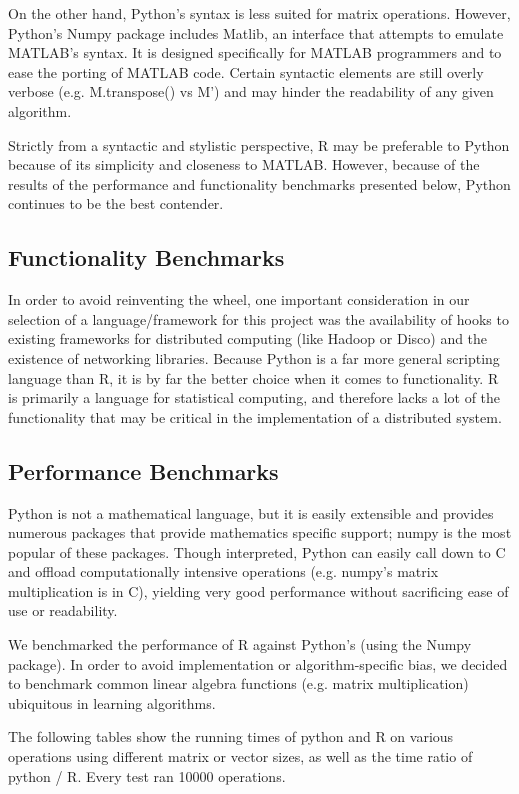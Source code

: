 \documentclass[%
  final,
  notitlepage,
  narroweqnarray,
  inline,
]{ieee}
\begin{document}
On the other hand, Python's syntax is less suited for matrix operations.
However, Python's Numpy package includes Matlib, an interface that attempts to
emulate MATLAB's syntax. It is designed specifically for MATLAB programmers and
to ease the porting of MATLAB code. Certain syntactic elements are still overly
verbose (e.g. M.transpose() vs M') and may hinder the readability of any given
algorithm.

Strictly from a syntactic and stylistic perspective, R may be preferable to
Python because of its simplicity and closeness to MATLAB. However, because
of the results of the performance and functionality benchmarks presented below,
Python continues to be the best contender.

\subsection{Functionality Benchmarks}

In order to avoid reinventing the wheel, one important consideration in our
selection of a language/framework for this project was the availability of hooks
to existing frameworks for distributed computing (like Hadoop or Disco) and the
existence of networking libraries. Because Python is a far more general
scripting language than R, it is by far the better choice when it comes to
functionality. R is primarily a language for statistical computing, and
therefore lacks a lot of the functionality that may be critical in the
implementation of a distributed system.

\subsection{Performance Benchmarks}

Python is not a mathematical language, but it is easily extensible and provides
numerous packages that provide mathematics specific support; numpy is the most
popular of these packages. Though interpreted, Python can easily call down to C
and offload computationally intensive operations (e.g. numpy's matrix
multiplication is in C), yielding very good performance without sacrificing ease
of use or readability.

We benchmarked the performance of R against Python's (using the Numpy package).
In order to avoid implementation or algorithm-specific bias, we decided to
benchmark common linear algebra functions (e.g. matrix multiplication)
ubiquitous in learning algorithms.

The following tables show the running times of python and R on various
operations using different matrix or vector sizes, as well as the time ratio of
python / R. Every test ran 10000 operations.
\end{document}
